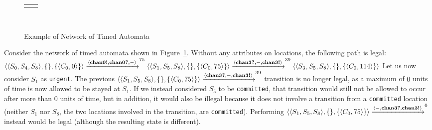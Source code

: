 \begin{figure}[hbt!]
   \centering
   \begin{tabular}{cc}
    &
   
   \end{tabular}\\
   
   \caption{Example of Network of Timed Automata}
   \label{fig:timed_automata_urgent_comitted}
\end{figure}

\begin{example}
\label{ex:urgent_vs_committed_locations}
Consider the network of timed automata shown in Figure~\ref{fig:timed_automata_urgent_comitted}.
Without any attributes on locations, the following path is legal:
$
   \langle \langle S_0, S_4, S_8 \rangle, \{\},  \{\langle C_0, 0\rangle\}\rangle \allowbreak
   \xrightarrow[]{\langle \textbf{chan0!}, \textbf{chan0?}, -\rangle}^{75}
   \allowbreak
   \langle \langle S_1, S_5, S_8 \rangle, \{\}, \{\langle C_0, 75\rangle\}\rangle \allowbreak
   \xrightarrow[]{\langle \textbf{chan3?}, -, \textbf{chan3!}\rangle}^{39}
   \allowbreak
   \langle \langle S_3, S_5, S_8 \rangle, \{\}, \{\langle C_0, 114\rangle\}\rangle \allowbreak
$
Let us now consider $S_1$ as \texttt{urgent}. The previous
$\langle \langle S_1, S_5, S_8 \rangle, \{\}, \{\langle C_0, 75\rangle\}\rangle \allowbreak
\xrightarrow[]{\langle \textbf{chan3?}, -, \textbf{chan3!}\rangle}^{39}$
transition is no longer legal, as a maximum of $0$ units of time is now allowed
to be stayed at $S_1$.
If we instead considered $S_5$ to be \texttt{committed}, that transition would
still not be allowed to occur after more than $0$ units of time, but in
addition, it would also be illegal because it does not involve a transition
from a \texttt{committed} location (neither $S_1$ nor $S_8$, the two locations
involved in the transition, are \texttt{committed}). Performing
$\langle \langle S_1, S_5, S_8 \rangle, \{\}, \{\langle C_0, 75\rangle\}\rangle \allowbreak
\xrightarrow[]{\langle -, \textbf{chan3?}, \textbf{chan3!}\rangle}^{0}$
instead would be legal (although the resulting state is different).
\end{example}

